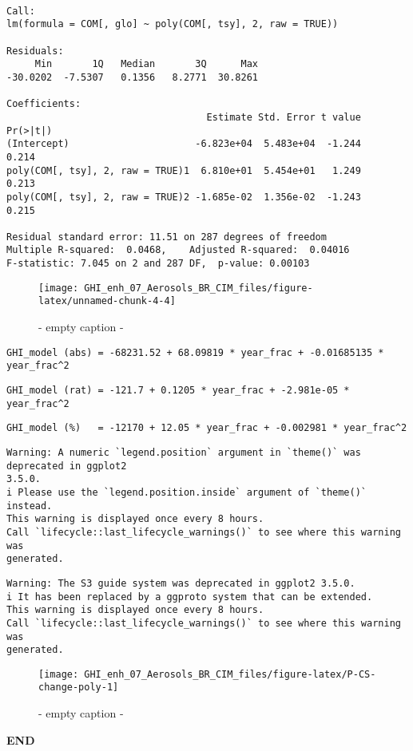 \documentclass[
  10pt,
  a4paper,oneside]{article}
\begin{document}
\begin{verbatim}

Call:
lm(formula = COM[, glo] ~ poly(COM[, tsy], 2, raw = TRUE))

Residuals:
     Min       1Q   Median       3Q      Max 
-30.0202  -7.5307   0.1356   8.2771  30.8261 

Coefficients:
                                   Estimate Std. Error t value Pr(>|t|)
(Intercept)                      -6.823e+04  5.483e+04  -1.244    0.214
poly(COM[, tsy], 2, raw = TRUE)1  6.810e+01  5.454e+01   1.249    0.213
poly(COM[, tsy], 2, raw = TRUE)2 -1.685e-02  1.356e-02  -1.243    0.215

Residual standard error: 11.51 on 287 degrees of freedom
Multiple R-squared:  0.0468,    Adjusted R-squared:  0.04016 
F-statistic: 7.045 on 2 and 287 DF,  p-value: 0.00103
\end{verbatim}

\begin{figure}[H]

{\centering \texttt{[image: GHI\_enh\_07\_Aerosols\_BR\_CIM\_files/figure-latex/unnamed-chunk-4-4]} 

}

\caption{ - empty caption - }\label{fig:unnamed-chunk-4-4}
\end{figure}

\begin{verbatim}
GHI_model (abs) = -68231.52 + 68.09819 * year_frac + -0.01685135 * year_frac^2 
\end{verbatim}

\begin{verbatim}
GHI_model (rat) = -121.7 + 0.1205 * year_frac + -2.981e-05 * year_frac^2 
\end{verbatim}

\begin{verbatim}
GHI_model (%)   = -12170 + 12.05 * year_frac + -0.002981 * year_frac^2 
\end{verbatim}

\begin{verbatim}
Warning: A numeric `legend.position` argument in `theme()` was deprecated in ggplot2
3.5.0.
i Please use the `legend.position.inside` argument of `theme()` instead.
This warning is displayed once every 8 hours.
Call `lifecycle::last_lifecycle_warnings()` to see where this warning was
generated.
\end{verbatim}

\begin{verbatim}
Warning: The S3 guide system was deprecated in ggplot2 3.5.0.
i It has been replaced by a ggproto system that can be extended.
This warning is displayed once every 8 hours.
Call `lifecycle::last_lifecycle_warnings()` to see where this warning was
generated.
\end{verbatim}

\begin{figure}[H]

{\centering \texttt{[image: GHI\_enh\_07\_Aerosols\_BR\_CIM\_files/figure-latex/P-CS-change-poly-1]} 

}

\caption{ - empty caption - }\label{fig:P-CS-change-poly}
\end{figure}

\textbf{END}
\end{document}
